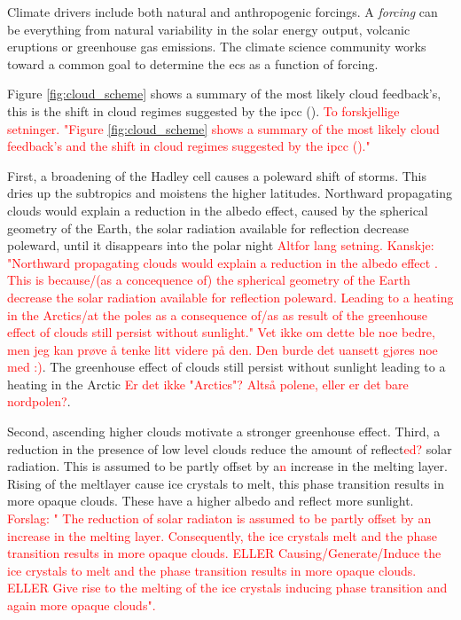 Climate drivers include both natural and anthropogenic forcings. A \textit{forcing} can be everything from natural variability in the solar energy output, volcanic eruptions or greenhouse gas emissions. The climate science community works toward a common goal to determine the \acrshort{ecs} as a function of forcing. %

Figure \ref{fig:cloud_scheme} shows a summary of the most likely cloud feedback's, this is the shift in cloud regimes suggested by the \acrshort{ipcc} (\cite{IPCC_CH7_clouds}). \textcolor{red}{To forskjellige setninger. "Figure \ref{fig:cloud_scheme} shows a summary of the most likely cloud feedback's and the shift in cloud regimes suggested by the \acrshort{ipcc} (\cite{IPCC_CH7_clouds})."}

First, a broadening of the Hadley cell causes a poleward shift of storms. This dries up the subtropics and moistens the higher latitudes. Northward propagating clouds would explain a reduction in the albedo effect, caused by the spherical geometry of the Earth, the solar radiation available for reflection decrease poleward, until it disappears into the polar night \textcolor{red}{Altfor lang setning. Kanskje: "Northward propagating clouds would explain a reduction in the albedo effect
. This is because/(as a concequence of)  the spherical geometry of the Earth decrease the solar radiation available for reflection poleward. Leading to a heating in the Arctics/at the poles as a consequence of/as as result of the greenhouse effect of clouds still persist without sunlight." Vet ikke om dette ble noe bedre, men jeg kan prøve å tenke litt videre på den. Den burde det uansett gjøres noe med :)}. 
The greenhouse effect of clouds still persist without sunlight leading to a heating in the Arctic \textcolor{red}{Er det ikke "Arctics"? Altså polene, eller er det bare nordpolen?}.

Second, ascending higher clouds motivate a stronger greenhouse effect. Third, a reduction in the presence of low level clouds reduce the amount of reflect\textcolor{red}{ed?} solar radiation. This is assumed to be partly offset by a\textcolor{red}{n} increase in the melting layer. Rising of the meltlayer cause ice crystals to melt, this phase transition results in more opaque clouds. These have a higher albedo and reflect more sunlight. \textcolor{red}{Forslag: " The reduction of solar radiaton is assumed to be partly offset by an increase in the melting layer. Consequently, the ice crystals melt and the phase transition results in more opaque clouds. ELLER   Causing/Generate/Induce the ice crystals to melt and the phase transition results in more opaque clouds. ELLER Give rise to the melting of the ice crystals inducing phase transition and again more opaque clouds".}